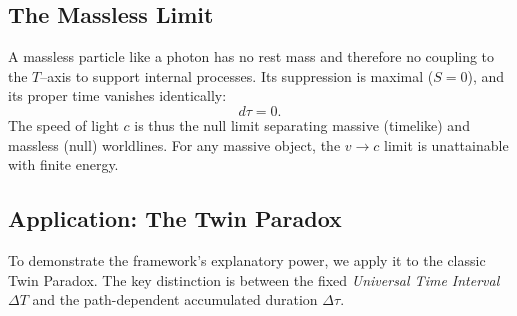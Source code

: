 \documentclass[12pt]{article}
\theoremstyle{plain} %
\begin{document}
\subsection*{The Massless Limit}
A massless particle like a photon has no rest mass and therefore no coupling to the $T$–axis to support internal processes. Its suppression is maximal ($S=0$), and its proper time vanishes identically:
\begin{equation}
d\tau=0.
\label{eq:PhotonNull}
\end{equation}
The speed of light $c$ is thus the null limit separating massive (timelike) and massless (null) worldlines. For any massive object, the $v\to c$ limit is unattainable with finite energy.

\subsection*{Application: The Twin Paradox}

To demonstrate the framework's explanatory power, we apply it to the classic Twin Paradox. 
The key distinction is between the fixed \emph{Universal Time Interval} $\Delta T$ and the path-dependent 
accumulated duration $\Delta\tau$.
\end{document}
